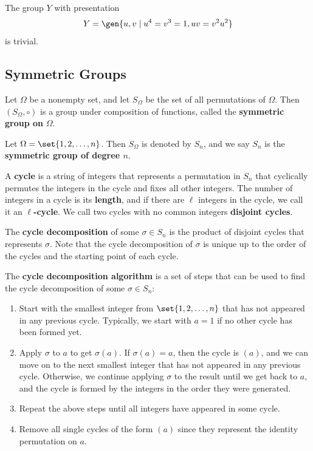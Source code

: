 \ex The group $Y$ with presentation
\[Y = \gen{u, v \mid u^4 = v^3 = 1, uv = v^2u^2}\]
is trivial.

\newpage

\subsection{Symmetric Groups} \label{sec1.3}

 Let $\Omega$ be a nonempty set, and let $S_\Omega$ be the set of all permutations of $\Omega$. Then $(S_\Omega, \circ)$ is a group under composition of functions, called the \textbf{symmetric group on} $\Omega$.

 Let $\Omega = \set{1, 2, \ldots, n}$. Then $S_\Omega$ is denoted by $S_n$, and we say $S_n$ is the \textbf{symmetric group of degree $n$}.

 A \textbf{cycle} is a string of integers that represents a permutation in $S_n$ that cyclically permutes the integers in the cycle and fixes all other integers. The number of integers in a cycle is its \textbf{length}, and if there are $\ell$ integers in the cycle, we call it an \textbf{$\ell$-cycle}. We call two cycles with no common integers \textbf{disjoint cycles}.

 The \textbf{cycle decomposition} of some $\sigma \in S_n$ is the product of disjoint cycles that represents $\sigma$. Note that the cycle decomposition of $\sigma$ is unique up to the order of the cycles and the starting point of each cycle.

 The \textbf{cycle decomposition algorithm} is a set of steps that can be used to find the cycle decomposition of some $\sigma \in S_n$:

\begin{enumerate}
    \item Start with the smallest integer from $\set{1, 2, \ldots, n}$ that has not appeared in any previous cycle. Typically, we start with $a = 1$ if no other cycle has been formed yet.
    \item Apply $\sigma$ to $a$ to get $\sigma(a)$. If $\sigma(a) = a$, then the cycle is $(a)$, and we can move on to the next smallest integer that has not appeared in any previous cycle. Otherwise, we continue applying $\sigma$ to the result until we get back to $a$, and the cycle is formed by the integers in the order they were generated.
    \item Repeat the above steps until all integers have appeared in some cycle.
    \item Remove all single cycles of the form $(a)$ since they represent the identity permutation on $a$.
\end{enumerate}

